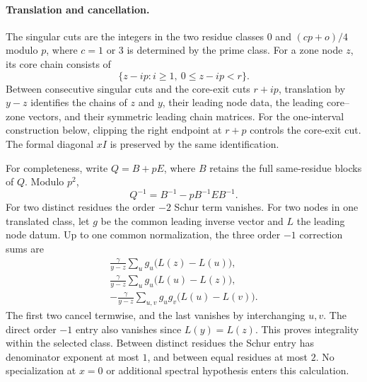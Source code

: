 \paragraph{Translation and cancellation.}
The singular cuts are the integers in the two residue classes
$0$ and $(cp+o)/4$ modulo $p$, where $c=1$ or $3$ is determined by the
prime class.  For a zone node $z$, its core chain consists of
\[
 \{z-ip: i\ge1,\ 0\le z-ip<r\}.
\]
Between consecutive singular cuts and the core-exit cuts $r+ip$, translation
by $y-z$ identifies the chains of $z$ and $y$, their leading node data,
the leading core--zone vectors, and their symmetric leading chain matrices.
For the one-interval construction below, clipping the right endpoint at
$r+p$ controls the core-exit cut.  The formal diagonal $xI$ is preserved
by the same identification.

For completeness, write $Q=B+pE$, where $B$ retains the full
same-residue blocks of $Q$.  Modulo $p^2$,
\[
 Q^{-1}=B^{-1}-pB^{-1}EB^{-1}.
\]
For two distinct residues the order $-2$ Schur term vanishes.  For two
nodes in one translated class, let $g$ be the common leading inverse
vector and $L$ the leading node datum.  Up to one common normalization,
the three order $-1$ correction sums are
\[
 \begin{gathered}\frac\gamma{y-z}\sum_u g_u\bigl(L(z)-L(u)\bigr),\\
 \frac\gamma{y-z}\sum_u g_u\bigl(L(u)-L(z)\bigr),\\
 -\frac\gamma{y-z}\sum_{u,v}g_ug_v\bigl(L(u)-L(v)\bigr).\end{gathered}
\]
The first two cancel termwise, and the last vanishes by interchanging
$u,v$.  The direct order $-1$ entry also vanishes since $L(y)=L(z)$.
This proves integrality within the selected class. Between distinct
residues the Schur entry has denominator exponent at most $1$, and between
equal residues at most $2$.
No specialization at $x=0$ or additional spectral hypothesis enters this
calculation.

